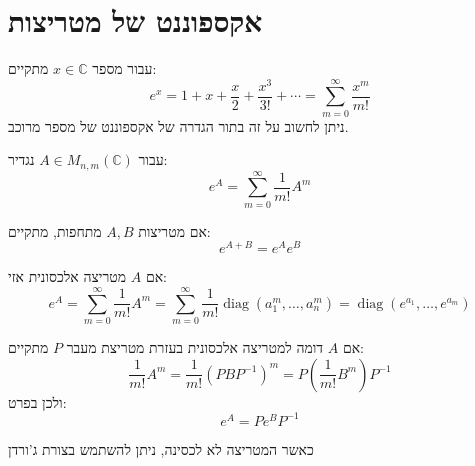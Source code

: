 \documentclass{tstextbook}
\begin{document}
\section{אקספוננט של מטריצות}

\begin{reminder}
עבור מספר \(x \in \mathbb{C}\) מתקיים:
$$e^{x}=1+x+{\frac{x}{2}}+{\frac{x^{3}}{3!}}+\cdots=\sum_{m=0}^{\infty}{\frac{x^{m}}{m!}}$$
ניתן לחשוב על זה בתור הגדרה של אקספוננט של מספר מרוכב.

\end{reminder}
\begin{definition}
עבור \(A \in M_{n,m}\left( \mathbb{C} \right)\) נגדיר:
$$e^{A}=\sum_{m=0}^{\infty}\frac{1}{m!}A^{m}$$

\end{definition}
\begin{proposition}
אם מטריצות \(A,B\) מתחפות, מתקיים:
$$e^{A+B}=e^{A}e^{B}$$

\end{proposition}
\begin{proposition}
אם \(A\) מטריצה אלכסונית אזי:
$$e^{A}=\sum_{m=0}^{\infty}{\frac{1}{m!}}A^{m}=\sum_{m=0}^{\infty}{\frac{1}{m!}}\operatorname{diag}(a_{1}^{m},\ldots,a_{n}^{m})=\operatorname{diag}(e^{a_{1}},\ldots,e^{a_{m}})$$

\end{proposition}
\begin{proposition}
אם \(A\) דומה למטריצה אלכסונית בעזרת מטריצת מעבר \(P\) מתקיים:
$${\frac{1}{m!}}A^{m}={\frac{1}{m!}}\left(P B P^{-1}\right)^{m}=P\left({\frac{1}{m!}}B^{m}\right)P^{-1}$$
ולכן בפרט:
$$e^{A}=P e^{B}P^{-1}$$

\end{proposition}
כאשר המטריצה לא לכסינה, ניתן להשתמש בצורת ג'ורדן
\end{document}
